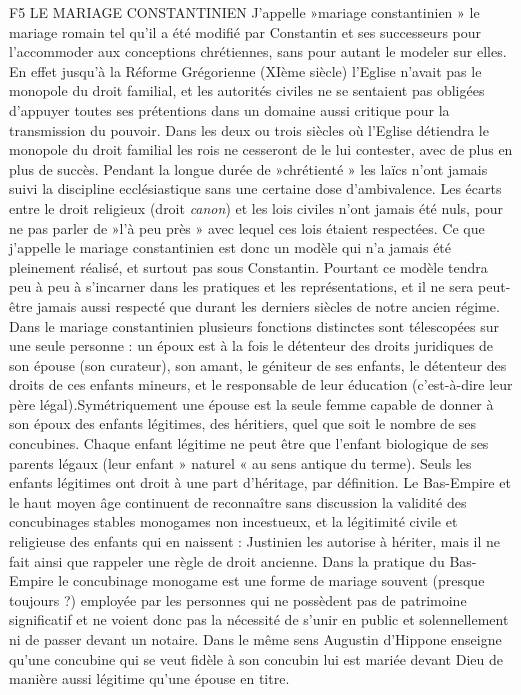 F5 LE MARIAGE CONSTANTINIEN
 J'appelle »mariage constantinien » le mariage romain tel qu'il a été modifié par Constantin et ses successeurs pour l'accommoder aux conceptions chrétiennes, sans pour autant le modeler sur elles. En effet jusqu'à la Réforme Grégorienne (XIème siècle) l'Eglise n'avait pas le monopole du droit familial, et les autorités civiles ne se sentaient pas obligées d'appuyer toutes ses prétentions dans un domaine aussi critique pour la transmission du pouvoir. Dans les deux ou trois siècles où l'Eglise détiendra le monopole du droit familial les rois ne cesseront de le lui contester, avec de plus en plus de succès. Pendant la longue durée de »chrétienté » les laïcs n'ont jamais suivi la discipline ecclésiastique sans une certaine dose d'ambivalence. Les écarts entre le droit religieux (droit \emph{canon}) et les lois civiles n'ont jamais été nuls, pour ne pas parler de »l'à peu près » avec lequel ces lois étaient respectées. Ce que j'appelle le mariage constantinien est donc un modèle qui n'a jamais été pleinement réalisé, et surtout pas sous Constantin. Pourtant ce modèle tendra peu à peu à s'incarner dans les pratiques et les représentations, et il ne sera peut-être jamais aussi respecté que durant les derniers siècles de notre ancien régime.
 Dans le mariage constantinien plusieurs fonctions distinctes sont télescopées sur une seule personne : un époux est à la fois le détenteur des droits juridiques de son épouse (son curateur), son amant, le géniteur de ses enfants, le détenteur des droits de ces enfants mineurs, et le responsable de leur éducation (c'est-à-dire leur père légal)\emph{.}Symétriquement une épouse est la seule femme capable de donner à son époux des enfants légitimes, des héritiers, quel que soit le nombre de ses concubines. Chaque enfant légitime ne peut être que l'enfant biologique de ses parents légaux (leur enfant » naturel « au sens antique du terme). Seuls les enfants légitimes ont droit à une part d'héritage, par définition.
 Le Bas-Empire et le haut moyen âge continuent de reconnaître sans discussion la validité des concubinages stables monogames non incestueux, et la légitimité civile et religieuse des enfants qui en naissent : Justinien les autorise à hériter, mais il ne fait ainsi que rappeler une règle de droit ancienne. Dans la pratique du Bas-Empire le concubinage monogame est une forme de mariage souvent (presque toujours ?) employée par les personnes qui ne possèdent pas de patrimoine significatif et ne voient donc pas la nécessité de s'unir en public et solennellement ni de passer devant un notaire. Dans le même sens Augustin d'Hippone enseigne qu'une concubine qui se veut fidèle à son concubin lui est mariée devant Dieu de manière aussi légitime qu'une épouse en titre.

